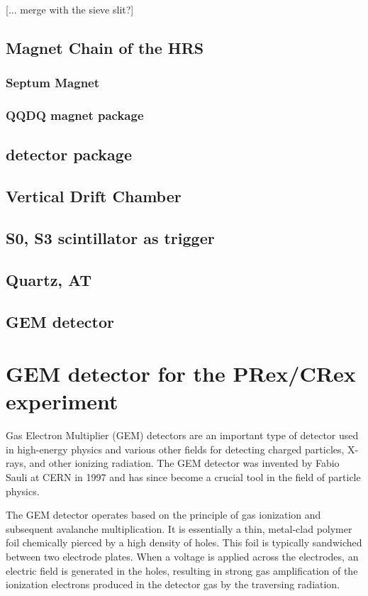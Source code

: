 [... merge with the sieve slit?]


\subsection{Magnet Chain of the HRS}


\subsubsection{Septum Magnet}
\subsubsection{QQDQ magnet package}

\subsection{detector package}

\subsection{Vertical Drift Chamber}
\subsection{S0, S3 scintillator as trigger}
\subsection{Quartz, AT}
\subsection{GEM detector}

\section{GEM detector for the PRex/CRex experiment}

Gas Electron Multiplier (GEM) detectors are an important type of detector used in high-energy physics and various other fields for detecting charged particles, X-rays, and other ionizing radiation. The GEM detector was invented by Fabio Sauli at CERN in 1997 and has since become a crucial tool in the field of particle physics.

The GEM detector operates based on the principle of gas ionization and subsequent avalanche multiplication. It is essentially a thin, metal-clad polymer foil chemically pierced by a high density of holes. This foil is typically sandwiched between two electrode plates. When a voltage is applied across the electrodes, an electric field is generated in the holes, resulting in strong gas amplification of the ionization electrons produced in the detector gas by the traversing radiation.

